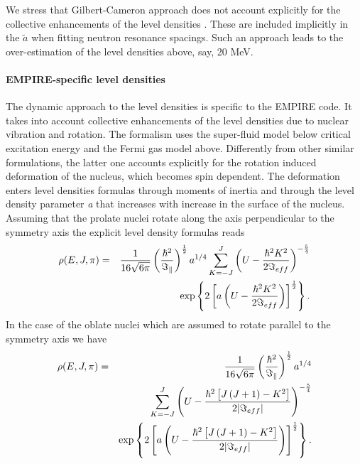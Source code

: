 We stress that Gilbert-Cameron approach does not account explicitly for the
collective enhancements of the level densities%
. These are included implicitly in the $%
\widetilde{a}$ when fitting neutron resonance spacings. Such an approach
leads to the over-estimation of the level densities above, say, 20 MeV.

\medskip

\paragraph{EMPIRE-specific level densities}

The dynamic approach to the level densities%
 is specific to the EMPIRE code. It takes into
account collective enhancements of the level densities due to nuclear
vibration and rotation. The formalism uses the super-fluid model below
critical excitation energy and the Fermi gas model above. Differently from
other similar formulations, the latter one accounts explicitly for the
rotation induced deformation of the nucleus, which becomes spin dependent.
The deformation enters level densities formulas through moments of inertia
and through the level density parameter \emph{a} that increases with
increase in the surface of the nucleus. Assuming that the prolate nuclei
rotate along the axis perpendicular to the symmetry axis the explicit level
density formulas reads 
\begin{eqnarray}
\rho(E,J,\pi) & = & 
\frac{1}{16\sqrt{6\pi}}\left(\frac{\hbar^{2}}{\Im_{\Vert}}\right)^{\frac{1}{2%
}}a^{1/4}\sum_{K=-J}^{J}\left(U-\frac{\hbar^{2}K^{2}}{2\Im_{eff}}\right)^{-%
\frac{5}{4}}  \notag \\
& & \exp\left\{ 2\left[a\left(U-\frac{\hbar^{2}K^{2}}{2\Im_{eff}}\right)%
\right]^{\frac{1}{2}}\right\} .  \label{ro1}
\end{eqnarray}
In the case of the oblate nuclei which are assumed to rotate parallel to the
symmetry axis we have 
\begin{eqnarray}
\rho(E,J,\pi) & = & \frac{1}{16\sqrt{6\pi}}\left(\frac{\hbar^{2}}{\Im_{\Vert}%
}\right)^{\frac{1}{2}}a^{1/4}  \notag \\
& & \sum_{K=-J}^{J}\left(U-\frac{\hbar^{2}\left[J\left(J+1\right)-K^{2}%
\right]}{2|\Im_{eff}|}\right)^{-\frac{5}{4}}  \label{ro2} \\
& & \exp\left\{ 2\left[a\left(U-\frac{\hbar^{2}\left[J\left(J+1\right)-K^{2}%
\right]}{2|\Im_{eff}|}\right)\right]^{\frac{1}{2}}\right\} .  \notag
\end{eqnarray}
